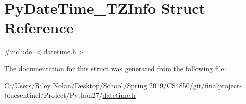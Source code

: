 \hypertarget{struct_py_date_time___t_z_info}{}\section{Py\+Date\+Time\+\_\+\+T\+Z\+Info Struct Reference}
\label{struct_py_date_time___t_z_info}


{\ttfamily \#include $<$datetime.\+h$>$}



The documentation for this struct was generated from the following file\+:\begin{DoxyCompactItemize}
\item 
C\+:/\+Users/\+Riley Nolan/\+Desktop/\+School/\+Spring 2019/\+C\+S4850/git/finalproject-\/bluesentinel/\+Project/\+Python27/\mbox{\hyperlink{datetime_8h}{datetime.\+h}}\end{DoxyCompactItemize}
